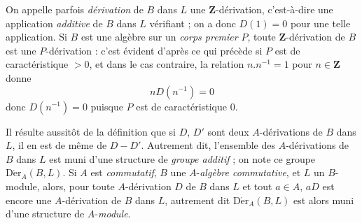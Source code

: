 On appelle parfois \emph{dérivation} de $B$ dans $L$ une
$\mathbf{Z}$-dérivation, c'est-à-dire une application \emph{additive} de $B$
dans $L$ vérifiant  ; on a donc $D(1)=0$ pour une telle
application. Si $B$ est une algèbre sur un \emph{corps premier} $P$, toute
$\mathbf{Z}$-dérivation de $B$ est une $P$-dérivation : c'est évident d'après
ce qui précède si $P$ est de caractéristique $>0$, et dans le cas contraire,
la relation $n.n^{-1}=1$ pour $n\in\mathbf{Z}$ donne
\[
  nD(n^{-1})=0
\]
donc $D(n^{-1})=0$ puisque $P$ est de caractéristique $0$.

Il résulte aussitôt de la définition  que si $D$, $D'$ sont
deux $A$-dérivations de $B$ dans $L$, il en est de même de $D-D'$. Autrement
dit, l'ensemble des $A$-dérivations de $B$ dans $L$ est muni d'une structure
de \emph{groupe additif} ; on note ce groupe
$\operatorname{D\acute{e}r}_A(B,L)$. Si $A$ est \emph{commutatif}, $B$ une
$A$-\emph{algèbre commutative}, et $L$ un $B$-module, alors, pour toute
$A$-dérivation $D$ de $B$ dans $L$ et tout $a\in A$, $aD$ est encore une
$A$-dérivation de $B$ dans $L$, autrement dit $\operatorname{D\acute{e}r}_A(B,L)$
est alors muni d'une structure de $A$-\emph{module}.

